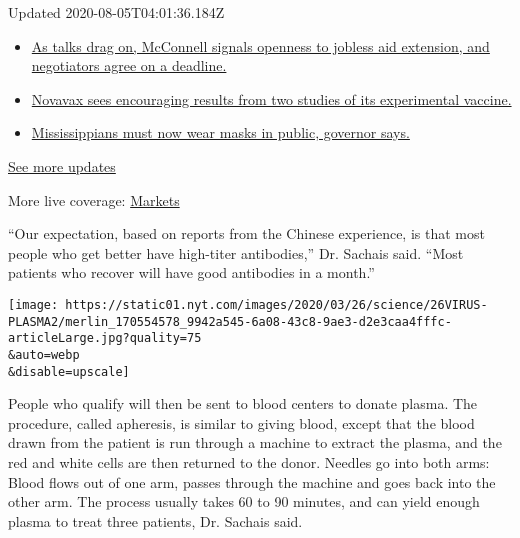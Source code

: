 Updated 2020-08-05T04:01:36.184Z

\begin{itemize}
\tightlist
\item
  \href{https://www.nytimes.com/2020/08/04/world/coronavirus-cases.html?action=click\&pgtype=Article\&state=default\&region=MAIN_CONTENT_1\&context=storylines_live_updates\#link-762df92}{As
  talks drag on, McConnell signals openness to jobless aid extension,
  and negotiators agree on a deadline.}
\item
  \href{https://www.nytimes.com/2020/08/04/world/coronavirus-cases.html?action=click\&pgtype=Article\&state=default\&region=MAIN_CONTENT_1\&context=storylines_live_updates\#link-1228a480}{Novavax
  sees encouraging results from two studies of its experimental
  vaccine.}
\item
  \href{https://www.nytimes.com/2020/08/04/world/coronavirus-cases.html?action=click\&pgtype=Article\&state=default\&region=MAIN_CONTENT_1\&context=storylines_live_updates\#link-794484ed}{Mississippians
  must now wear masks in public, governor says.}
\end{itemize}

\href{https://www.nytimes.com/2020/08/04/world/coronavirus-cases.html?action=click\&pgtype=Article\&state=default\&region=MAIN_CONTENT_1\&context=storylines_live_updates}{See
more updates}

More live coverage:
\href{https://www.nytimes.com/live/2020/08/04/business/stock-market-today-coronavirus?action=click\&pgtype=Article\&state=default\&region=MAIN_CONTENT_1\&context=storylines_live_updates}{Markets}

``Our expectation, based on reports from the Chinese experience, is that
most people who get better have high-titer antibodies,'' Dr. Sachais
said. ``Most patients who recover will have good antibodies in a
month.''

\texttt{[image: https://static01.nyt.com/images/2020/03/26/science/26VIRUS-PLASMA2/merlin\_170554578\_9942a545-6a08-43c8-9ae3-d2e3caa4fffc-articleLarge.jpg?quality=75\\\&auto=webp\\\&disable=upscale]}

People who qualify will then be sent to blood centers to donate plasma.
The procedure, called apheresis, is similar to giving blood, except that
the blood drawn from the patient is run through a machine to extract the
plasma, and the red and white cells are then returned to the donor.
Needles go into both arms: Blood flows out of one arm, passes through
the machine and goes back into the other arm. The process usually takes
60 to 90 minutes, and can yield enough plasma to treat three patients,
Dr. Sachais said.

